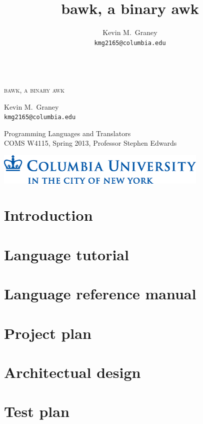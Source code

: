 \documentclass[letterpaper,11pt]{report}
\title{bawk, a binary awk}
\author{
	Kevin M.\ Graney\\
	\texttt{kmg2165@columbia.edu}
}
\begin{document}
\begin{titlepage}
\begin{center}
~\\\vspace{1.75in}
\Huge
\textsc{bawk, a binary awk}

\vspace{1in}
\LARGE
Kevin M.\ Graney\\
\texttt{kmg2165@columbia.edu}

\Large
\vspace{1.75in}
Programming Languages and Translators\\
COMS W4115, Spring 2013, Professor Stephen Edwards

\end{center}
\vfill
\includegraphics[width=4in]{columbia_university.eps}
\end{titlepage}
\tableofcontents
\lstlistoflistings

\chapter{Introduction}


\chapter{Language tutorial}
\chapter{Language reference manual}


\chapter{Project plan}
\chapter{Architectual design}


\chapter{Test plan}

\end{document}
